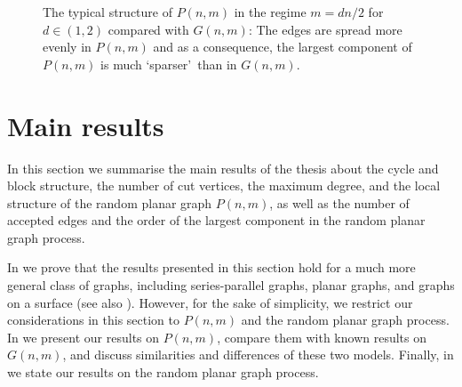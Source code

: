 \begin{figure}[t]
	\caption{The typical structure of $P(n,m)$ in the regime $m=dn/2$ for $d\in (1,2)$ compared with $G(n,m)$: The edges are spread more evenly in $P(n,m)$ and as a consequence, the largest component of $P(n,m)$ is much \lq sparser\rq\ than in $G(n,m)$.}
	\label{fig:pnm-vs-gnm}
\end{figure}

\section{Main results}\label{sec:main_results}
In this section we summarise the main results of the thesis about the cycle and block structure, the number of cut vertices, the maximum degree, and the local structure of the random planar graph $P(n,m)$, as well as the number of accepted edges and the order of the largest component in the random planar graph process.

In  we prove that the results presented in this section hold for a much more general class of graphs, including series-parallel graphs, planar graphs, and graphs on a surface (see also ). However, for the sake of simplicity, we restrict our considerations in this section to $P(n,m)$ and the random planar graph process. In  we present our results on $P(n,m)$, compare them with known results on $G(n,m)$, and discuss similarities and differences of these two models. Finally, in  we state our results on the random planar graph process.

